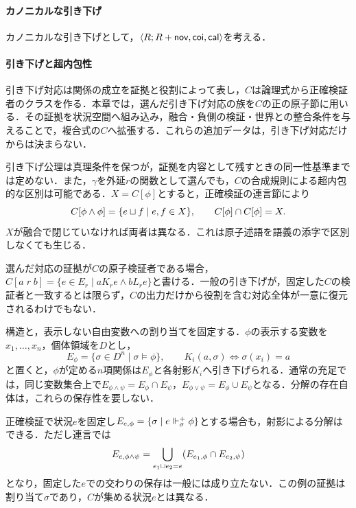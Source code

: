 \documentclass[../../main-detail.tex]{subfiles}
\begin{document}
\paragraph{カノニカルな引き下げ}
カノニカルな引き下げとして，$\langle R;R+\textsf{nov},\textsf{coi},\textsf{cal}\rangle$を考える．

\paragraph{引き下げと超内包性}
引き下げ対応は関係の成立を証拠と役割によって表し，$C$は論理式から正確検証者のクラスを作る．本章では，選んだ引き下げ対応の族を$C$の正の原子節に用いる．その証拠を状況空間へ組み込み，融合・負側の検証・世界との整合条件を与えることで，複合式の$C$へ拡張する．これらの追加データは，引き下げ対応だけからは決まらない．

引き下げ公理は真理条件を保つが，証拠を内容として残すときの同一性基準までは定めない．また，$\gamma$を外延$r$の関数として選んでも，$C$の合成規則による超内包的な区別は可能である．$X=C[\phi]$とすると，正確検証の連言節により
\[
    C[\phi\land\phi]=\{e\sqcup f\mid e,f\in X\},
    \qquad C[\phi]\cap C[\phi]=X.
\]
$X$が融合で閉じていなければ両者は異なる．これは原子述語を語義の添字で区別しなくても生じる．

選んだ対応の証拠が$C$の原子検証者である場合，$C[a\;r\;b]=\{e\in E_r\mid aK_re\land bL_re\}$と書ける．一般の引き下げが，固定した$C$の検証者と一致するとは限らず，$C$の出力だけから役割を含む対応全体が一意に復元されるわけでもない．

\begin{example}[割り当てを証拠とする引き下げ]
    構造と，表示しない自由変数への割り当てを固定する．$\phi$の表示する変数を$x_1,\ldots,x_n$，個体領域を$D$とし，
    \[
        E_\phi=\{\sigma\in D^n\mid\sigma\models\phi\},\qquad
        K_i(a,\sigma)\iff\sigma(x_i)=a
    \]
    と置くと，$\phi$が定める$n$項関係は$E_\phi$と各射影$K_i$へ引き下げられる．通常の充足では，同じ変数集合上で$E_{\phi\land\psi}=E_\phi\cap E_\psi$，$E_{\phi\lor\psi}=E_\phi\cup E_\psi$となる．分解の存在自体は，これらの保存性を要しない．

    正確検証で状況$e$を固定し$E_{e,\phi}=\{\sigma\mid e\Vdash^{+}_\sigma\phi\}$とする場合も，射影による分解はできる．ただし連言では
    \[
        E_{e,\phi\land\psi}=\bigcup_{e_1\sqcup e_2=e}
        (E_{e_1,\phi}\cap E_{e_2,\psi})
    \]
    となり，固定した$e$での交わりの保存は一般には成り立たない．この例の証拠は割り当て$\sigma$であり，$C$が集める状況$e$とは異なる．
\end{example}
\end{document}
